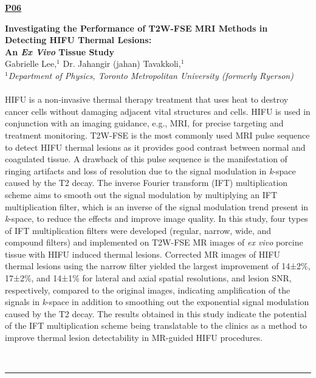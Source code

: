 \documentclass[titlepage,oneside,openany,10pt]{book}
\newenvironment{posterabs}[4] %
        {
	\begin{flushright}
                \underline{\textbf{#4}}
        \end{flushright}
        \textbf{#1}\\%
        #2\\%
        \textit{#3}\\\\%
        }
        {
        \\
        \noindent\rule{15cm}{0.5pt}%
        }
\begin{document}
\vspace{1cm}

\begin{posterabs}
    {Investigating the Performance of T2W-FSE MRI Methods in Detecting HIFU Thermal Lesions:\\An \emph{Ex Vivo} Tissue Study}
    {Gabrielle Lee,$^{1}$ Dr. Jahangir (jahan) Tavakkoli,$^{1}$}
    {
    $^1$Department of Physics, Toronto Metropolitan University (formerly Ryerson)
    }
    {P06}
    HIFU is a non-invasive thermal therapy treatment that uses heat to destroy cancer cells without damaging adjacent vital structures and cells. HIFU is used in conjunction with an imaging guidance, e.g., MRI, for precise targeting and treatment monitoring. T2W-FSE is the most commonly used MRI pulse sequence to detect HIFU thermal lesions as it provides good contrast between normal and coagulated tissue. A drawback of this pulse sequence is the manifestation of ringing artifacts and loss of resolution due to the signal modulation in {\emph{k}}-space caused by the T2 decay. The inverse Fourier transform (IFT) multiplication scheme aims to smooth out the signal modulation by multiplying an IFT multiplication filter, which is an inverse of the signal modulation trend present in {\emph{k}}-space, to reduce the effects and improve image quality. In this study, four types of IFT multiplication filters were developed (regular, narrow, wide, and compound filters) and implemented on T2W-FSE MR images of \emph{ex vivo} porcine tissue with HIFU induced thermal lesions. Corrected MR images of HIFU thermal lesions using the narrow filter yielded the largest improvement of 14{±}2\%, 17{±}2\%, and 14{±}1\% for lateral and axial spatial resolutions, and lesion SNR, respectively, compared to the original images, indicating amplification of the signals in {\emph{k}}-space in addition to smoothing out the exponential signal modulation caused by the T2 decay. The results obtained in this study indicate the potential of the IFT multiplication scheme being translatable to the clinics as a method to improve thermal lesion detectability in MR-guided HIFU procedures.
    \label{LeeG}
\end{posterabs}

\vspace{1cm}
\end{document}
